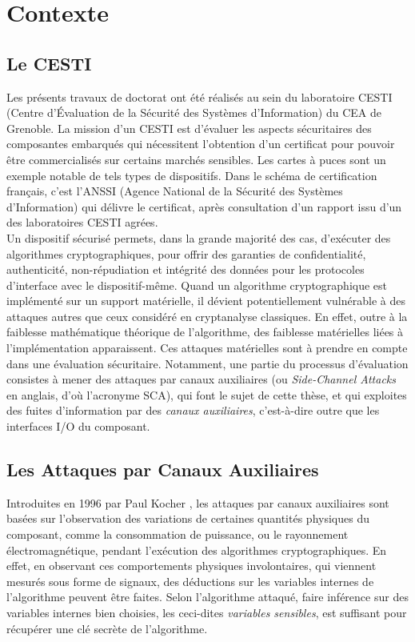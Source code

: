 \section{Contexte}\label{sec:contexte}
\subsection{Le CESTI}
Les pr\'esents travaux de doctorat ont \'et\'e r\'ealis\'es au sein du laboratoire CESTI (Centre d'\'Evaluation de la S\'ecurit\'e des Syst\`emes d'Information) du CEA de Grenoble. La mission d'un CESTI est d'\'evaluer les aspects s\'ecuritaires des composantes embarqu\'es qui n\'ecessitent l'obtention d'un certificat pour pouvoir \^etre commercialis\'es sur certains march\'es sensibles. Les cartes \`a puces sont un exemple notable de tels types de dispositifs. Dans le sch\'ema de certification français, c'est l'ANSSI (Agence National de la S\'ecurit\'e des Syst\`emes d'Information) qui d\'elivre le certificat, apr\`es consultation d'un rapport issu d'un des laboratoires CESTI agr\'ees. \\
     

Un dispositif s\'ecuris\'e permets, dans la grande majorit\'e des cas, d'ex\'ecuter des algorithmes cryptographiques, pour offrir des garanties de confidentialit\'e, authenticit\'e, non-r\'epudiation et int\'egrit\'e des donn\'ees pour les protocoles d'interface avec le dispositif-m\^{e}me. Quand un algorithme cryptographique est impl\'ement\'e sur un support mat\'erielle, il d\'evient potentiellement vuln\'erable \`{a} des attaques autres que ceux consid\'er\'e en cryptanalyse classiques. En effet, outre \`{a} la faiblesse math\'ematique th\'eorique de l'algorithme, des faiblesse mat\'erielles li\'ees \`{a} l'impl\'ementation apparaissent. Ces attaques mat\'erielles sont \`{a} prendre en compte dans une \'evaluation s\'ecuritaire. Notamment, une partie du processus d'\'evaluation consistes \`{a} mener des attaques par canaux auxiliaires (ou \emph{Side-Channel Attacks} en anglais, d'o\`u l'acronyme SCA), qui font le sujet de cette th\`{e}se, et qui exploites des fuites d'information par des \emph{canaux auxiliaires}, c'est-\`a-dire outre que les interfaces I/O du composant.

\subsection{Les Attaques par Canaux Auxiliaires}

Introduites en 1996 par Paul Kocher  \cite{kocher1996timing}, les attaques par canaux auxiliaires sont bas\'ees sur l'observation des variations de certaines quantit\'es physiques du composant, comme la consommation de puissance, ou le rayonnement \'electromagn\'etique, pendant l'ex\'ecution des algorithmes cryptographiques. En effet, en observant ces comportements physiques involontaires, qui viennent mesurés sous forme de signaux, des d\'eductions sur les variables internes de l'algorithme peuvent \^{e}tre faites. Selon l'algorithme attaqu\'e, faire inf\'erence sur des variables internes bien choisies, les ceci-dites \emph{variables sensibles}, est suffisant pour r\'ecup\'erer une cl\'e secr\`{e}te de l'algorithme. 

